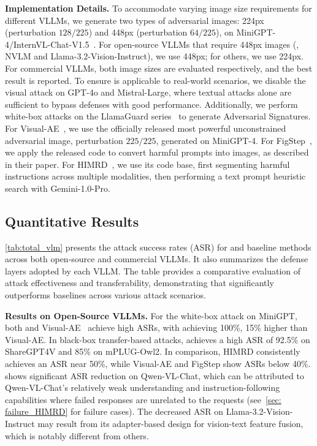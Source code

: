 \vspace{-2pt}
\noindent \textbf{Implementation Details.}
To accommodate varying image size requirements for different VLLMs, we generate two types of adversarial images: 224px (perturbation $128/225$) and 448px (perturbation $64/225$), on MiniGPT-4/InternVL-Chat-V1.5~\cite{chen2024far, zhu2023minigpt}. For open-source VLLMs that require 448px images (\eg, NVLM and Llama-3.2-Vision-Instruct), we use 448px; for others, we use 224px. For commercial VLLMs, both image sizes are evaluated respectively, and the best result is reported. To ensure \mfa is applicable to real-world scenarios, we disable the visual attack on GPT-4o and Mistral-Large, where textual attacks alone are sufficient to bypass defenses with good performance.  Additionally, we perform white-box attacks on the LlamaGuard series~\cite{llamaguard1, llamaguard2, llamaguard3} to generate Adversarial Signatures.
For Visual-AE~\cite{qi2023visual}, we use the officially released most powerful unconstrained adversarial image, \ie perturbation $225/225$, generated on MiniGPT-4.
For FigStep~\cite{gong2023figstep}, we apply the released code to convert harmful prompts into images, as described in their paper.
For HIMRD~\cite{teng2025heuristicinducedmultimodalriskdistribution}, we use its code base, first segmenting harmful instructions across multiple modalities, then performing a text prompt heuristic search with Gemini-1.0-Pro.

  
\vspace{-5pt}
\subsection{Quantitative Results}\vspace{-3pt}
\cref{tab:total_vlm} presents the attack success rates (ASR) for \mfa and baseline methods across both open-source and commercial VLLMs. It also summarizes the defense layers adopted by each VLLM. The table provides a comparative evaluation of attack effectiveness and transferability, demonstrating that \mfa significantly outperforms baselines across various attack scenarios.

\vspace{-3pt}
\textbf{Results on Open-Source VLLMs.}
For the white-box attack on MiniGPT, both \mfa and Visual-AE~\cite{qi2023visual} achieve high ASRs, with \mfa achieving 100\%, 15\% higher than Visual-AE. In black-box transfer-based attacks, \mfa achieves a high ASR of 92.5\% on ShareGPT4V and 85\% on mPLUG-Owl2. In comparison, HIMRD consistently achieves an ASR near 50\%, while Visual-AE and FigStep show ASRs below 40\%. \mfa shows significant ASR reduction on Qwen-VL-Chat, which can be attributed to Qwen-VL-Chat's relatively weak understanding and instruction-following capabilities where failed responses are unrelated to the requests (see~\cref{sec: failure_HIMRD} for failure cases). The decreased ASR on Llama-3.2-Vision-Instruct may result from its adapter-based design for vision-text feature fusion, which is notably different from others. 

